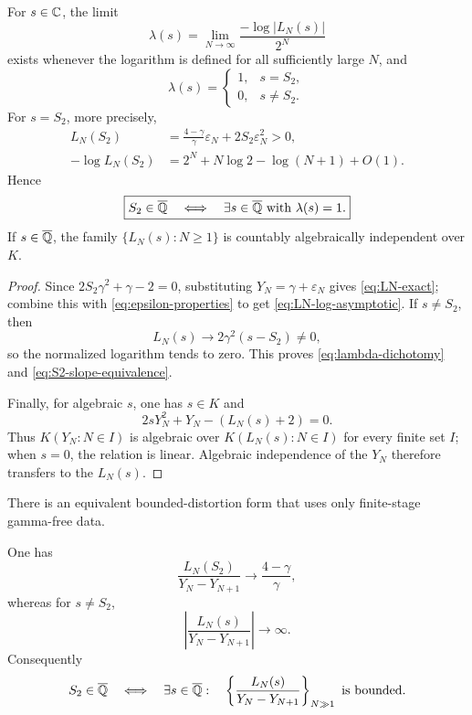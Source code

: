 \begin{theorem}
\label{thm:critical-slope}
For \(s\in\mathbb C\), the limit
\[
 \lambda(s)=\lim_{N\to\infty}
 \frac{-\log|L_N(s)|}{2^N}
\]
exists whenever the logarithm is defined for all sufficiently large \(N\),
and
\begin{equation}\label{eq:lambda-dichotomy}
 \lambda(s)=
 \begin{cases}
 1,&s=S_2,\\
 0,&s\ne S_2.
 \end{cases}
\end{equation}
For \(s=S_2\), more precisely,
\begin{align}
 L_N(S_2)
 &=\frac{4-\gamma}{\gamma}\varepsilon_N
 +2S_2\varepsilon_N^2>0,\label{eq:LN-exact}\\
 -\log L_N(S_2)
 &=2^N+N\log2-\log(N+1)+O(1).
 \label{eq:LN-log-asymptotic}
\end{align}
Hence
\begin{equation}\label{eq:S2-slope-equivalence}
 \boxed{\displaystyle
 S_2\in\overline{\mathbb Q}
 \quad\Longleftrightarrow\quad
 \exists s\in\overline{\mathbb Q}\text{ with }\lambda(s)=1.}
\end{equation}
If \(s\in\overline{\mathbb Q}\), the family \(\{L_N(s):N\ge1\}\) is countably
algebraically independent over \(K\).
\end{theorem}

\begin{proof}
Since \(2S_2\gamma^2+\gamma-2=0\), substituting
\(Y_N=\gamma+\varepsilon_N\) gives \eqref{eq:LN-exact}; combine this with
\eqref{eq:epsilon-properties} to get \eqref{eq:LN-log-asymptotic}.  If
\(s\ne S_2\), then
\[
 L_N(s)\longrightarrow2\gamma^2(s-S_2)\ne0,
\]
so the normalized logarithm tends to zero.  This proves
\eqref{eq:lambda-dichotomy} and \eqref{eq:S2-slope-equivalence}.

Finally, for algebraic \(s\), one has \(s\in K\) and
\[
 2sY_N^2+Y_N-(L_N(s)+2)=0.
\]
Thus \(K(Y_N:N\in I)\) is algebraic over
\(K(L_N(s):N\in I)\) for every finite set \(I\); when \(s=0\), the relation
is linear.  Algebraic independence of the \(Y_N\) therefore transfers to the
\(L_N(s)\).
\end{proof}

There is an equivalent bounded-distortion form that uses only finite-stage
gamma-free data.

\begin{corollary}
\label{cor:bounded-distortion}
One has
\begin{equation}\label{eq:bounded-distortion-limit}
 \frac{L_N(S_2)}{Y_N-Y_{N+1}}
 \longrightarrow\frac{4-\gamma}{\gamma},
\end{equation}
whereas for \(s\ne S_2\),
\[
 \left|\frac{L_N(s)}{Y_N-Y_{N+1}}\right|\longrightarrow\infty.
\]
Consequently
\begin{equation}\label{eq:bounded-equivalence}
 S_2\in\overline{\mathbb Q}
 \quad\Longleftrightarrow\quad
 \exists s\in\overline{\mathbb Q}:\quad
 \left\{\frac{L_N(s)}{Y_N-Y_{N+1}}\right\}_{N\gg1}
 \text{ is bounded}.
\end{equation}
\end{corollary}

